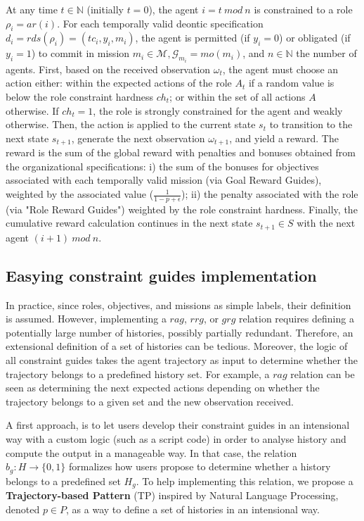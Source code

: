 \documentclass[sigconf,anonymous]{aamas}
\begin{document}
At any time $t \in \mathbb{N}$ (initially $t = 0$), the agent $i = t \ mod \ n$ is constrained to a role $\rho_i = ar(i)$. For each temporally valid deontic specification $d_i = rds(\rho_i) = (tc_i,y_i, m_i)$, the agent is permitted (if $y_i = 0$) or obligated (if $y_i = 1$) to commit in mission $m_i \in \mathcal{M}, \mathcal{G}_{m_i} = mo(m_i)$, and $n \in \mathbb{N}$ the number of agents.
%
First, based on the received observation $\omega_t$, the agent must choose an action either: within the expected actions of the role $A_t$ if a random value is below the role constraint hardness $ch_t$; or within the set of all actions $A$ otherwise. If $ch_t = 1$, the role is strongly constrained for the agent and weakly otherwise.
%
Then, the action is applied to the current state $s_t$ to transition to the next state $s_{t+1}$, generate the next observation $\omega_{t+1}$, and yield a reward. The reward is the sum of the global reward with penalties and bonuses obtained from the organizational specifications: \quad i) the sum of the bonuses for objectives associated with each temporally valid mission (via Goal Reward Guides), weighted by the associated value ($\frac{1}{1-p+\epsilon}$); \quad ii) the penalty associated with the role (via "Role Reward Guides") weighted by the role constraint hardness.
%
Finally, the cumulative reward calculation continues in the next state $s_{t+1} \in S$ with the next agent $(i+1) \ mod \ n$.

\subsection{Easying constraint guides implementation}

In practice, since roles, objectives, and missions as simple labels, their definition is assumed. However, implementing a $rag$, $rrg$, or $grg$ relation requires defining a potentially large number of histories, possibly partially redundant. Therefore, an extensional definition of a set of histories can be tedious. Moreover, the logic of all constraint guides takes the agent trajectory as input to determine whether the trajectory belongs to a predefined history set. For example, a $rag$ relation can be seen as determining the next expected actions depending on whether the trajectory belongs to a given set and the new observation received.

A first approach, is to let users develop their constraint guides in an intensional way with a custom logic (such as a script code) in order to analyse history and compute the output in a manageable way. In that case, the relation $b_g: H \to \{0,1\}$ formalizes how users propose to determine whether a history belongs to a predefined set $H_g$.
To help implementing this relation, we propose a \textbf{Trajectory-based Pattern} (TP) inspired by Natural Language Processing, denoted $p \in P$, as a way to define a set of histories in an intensional way.
\end{document}
